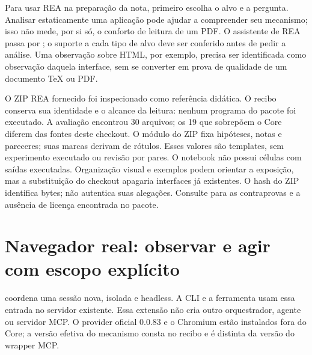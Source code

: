 \begin{descricao}
Para usar REA na preparação da nota, primeiro escolha o alvo e a pergunta.
Analisar estaticamente uma aplicação pode ajudar a compreender seu mecanismo;
isso não mede, por si só, o conforto de leitura de um PDF. O assistente de REA
passa por ; o suporte a cada
tipo de alvo deve ser conferido antes de pedir a análise. Uma observação sobre
HTML, por exemplo, precisa ser identificada como observação daquela interface,
sem se converter em prova de qualidade de um documento TeX ou PDF.
\end{descricao}

\begin{aviso}
O ZIP REA fornecido foi inspecionado como referência didática. O recibo
 conserva sua identidade e o alcance da
leitura: nenhum programa do pacote foi executado. A avaliação encontrou 30
arquivos; os 19 que sobrepõem o Core diferem das fontes deste checkout. O módulo
 do ZIP fixa hipóteses, notas e pareceres; suas
marcas  derivam de rótulos. Esses valores são templates, sem
experimento executado ou revisão por pares. O notebook não possui células com
saídas executadas. Organização visual e exemplos podem orientar a exposição,
mas a substituição do checkout apagaria interfaces já existentes. O hash do ZIP
identifica bytes; não autentica suas alegações. Consulte
 para as contraprovas e a ausência de licença
encontrada no pacote.
\end{aviso}

\clearpage
\section{Navegador real: observar e agir com escopo explícito}


\begin{descricao}
 coordena uma sessão nova,
isolada e headless. A CLI  e a ferramenta
 usam essa entrada no servidor
 existente. Essa extensão não cria outro orquestrador,
agente ou servidor MCP. O provider oficial  0.0.83 e o
Chromium estão instalados fora do Core; a versão efetiva do mecanismo consta
no recibo e é distinta da versão do wrapper MCP.
\end{descricao}

